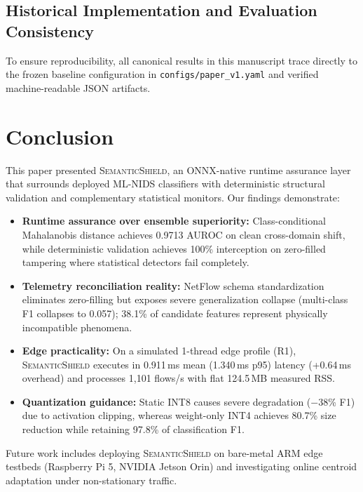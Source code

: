 \documentclass[journal]{IEEEtran}
\newcommand{\sysname}{\textsc{SemanticShield}}
\begin{document}
\subsection{Historical Implementation and Evaluation Consistency}
To ensure reproducibility, all canonical results in this manuscript trace directly to the frozen baseline configuration in \texttt{configs/paper\_v1.yaml} and verified machine-readable JSON artifacts.


\section{Conclusion}
\label{sec:conclusion}

This paper presented \sysname{}, an ONNX-native runtime assurance layer that surrounds deployed ML-NIDS classifiers with deterministic structural validation and complementary statistical monitors. Our findings demonstrate:
\begin{itemize}[leftmargin=*]
  \item \textbf{Runtime assurance over ensemble superiority:} Class-conditional Mahalanobis distance achieves 0.9713 AUROC on clean cross-domain shift, while deterministic validation achieves 100\% interception on zero-filled tampering where statistical detectors fail completely.
  \item \textbf{Telemetry reconciliation reality:} NetFlow schema standardization eliminates zero-filling but exposes severe generalization collapse (multi-class F1 collapses to 0.057); 38.1\% of candidate features represent physically incompatible phenomena.
  \item \textbf{Edge practicality:} On a simulated 1-thread edge profile (R1), \sysname{} executes in 0.911\,ms mean (1.340\,ms p95) latency (+0.64\,ms overhead) and processes 1,101 flows/s with flat 124.5\,MB measured RSS.
  \item \textbf{Quantization guidance:} Static INT8 causes severe degradation ($-$38\% F1) due to activation clipping, whereas weight-only INT4 achieves 80.7\% size reduction while retaining 97.8\% of classification F1.
\end{itemize}

Future work includes deploying \sysname{} on bare-metal ARM edge testbeds (Raspberry Pi 5, NVIDIA Jetson Orin) and investigating online centroid adaptation under non-stationary traffic.

\balance


\end{document}
